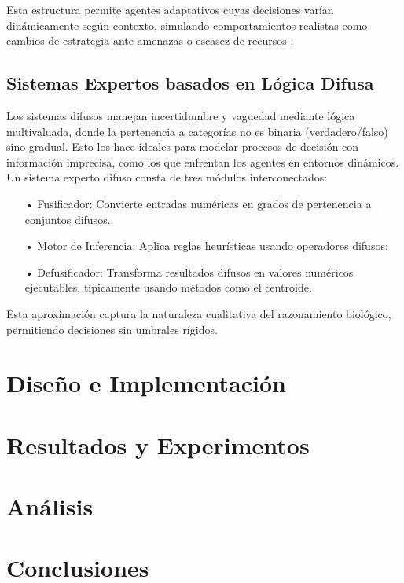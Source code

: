 \documentclass[letterpaper, 12pt]{report}
\begin{document}
Esta estructura permite agentes adaptativos cuyas decisiones varían dinámicamente según contexto, simulando comportamientos realistas como cambios de estrategia ante amenazas o escasez de recursos \cite{rao1995bdi}.

\section{Sistemas Expertos basados en Lógica Difusa}

Los sistemas difusos manejan incertidumbre y vaguedad mediante lógica multivaluada, donde la pertenencia a categorías no es binaria (verdadero/falso) sino gradual. Esto los hace ideales para modelar procesos de decisión con información imprecisa, como los que enfrentan los agentes en entornos dinámicos. \\

Un sistema experto difuso consta de tres módulos interconectados:

\begin{itemize}

\item[•] Fusificador: Convierte entradas numéricas en grados de pertenencia a conjuntos difusos.

\item[•] Motor de Inferencia: Aplica reglas heurísticas usando operadores difusos:

\item[•] Defusificador: Transforma resultados difusos en valores numéricos ejecutables, típicamente usando métodos como el centroide.
    
\end{itemize}

Esta aproximación captura la naturaleza cualitativa del razonamiento biológico, permitiendo decisiones sin umbrales rígidos.

\chapter{Diseño e Implementación}

\chapter{Resultados y Experimentos}

\chapter{Análisis}


\chapter{Conclusiones}



 
\end{document}

